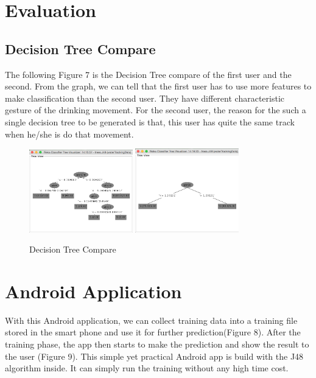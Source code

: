 \documentclass[12pt,twocolumn]{article}
\begin{document}
\section{Evaluation}

\subsection{Decision Tree Compare}
The following Figure 7 is the Decision Tree compare of the first user and the second. From the graph, we can tell that the first user has to use more features to make classification  than the second user. They have different characteristic gesture of the drinking movement. For the second user, the reason for the such a single decision tree to be generated is that, this user has quite the same track when he/she is do that movement\cite{Korting}.

\begin{figure}[htbp]
\centering
\includegraphics[width=0.4\textwidth]{j48_tree_m}
\includegraphics[width=0.4\textwidth]{j48_tree_f}
\caption{Decision Tree Compare}
\label{fig:j48_tree}
\end{figure}

\section{Android Application}
With this Android application, we can collect training data into a training file stored in the smart phone and use it for further prediction(Figure 8). After the training phase, the app then starts to make the prediction and show the result to the user (Figure 9). This simple yet practical Android app is build with the J48 algorithm inside. It can simply run the training without any high time cost\cite{androiddeveloper}.
\end{document}
